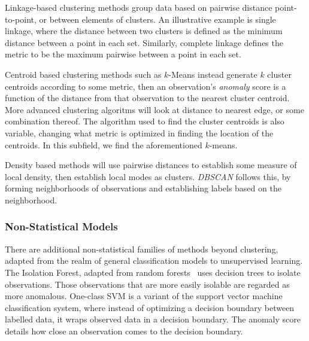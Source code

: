 Linkage-based clustering methods group data based on pairwise distance point-to-point, or between
  elements of clusters.  An illustrative example is single linkage, where the distance between two
  clusters is defined as the minimum distance between a point in each set.   Similarly, complete
  linkage defines the metric to be the maximum pairwise between a point in each set. \findcite

Centroid based clustering methods such as $k$-Means instead generate $k$ cluster centroids according
  to some metric, then an observation's \emph{anomaly} score is a function of the distance from that
  observation to the nearest cluster centroid.  More advanced clustering algoritms will look at
  distance to nearest edge, or some combination thereof.  The algorithm used to find the cluster
  centroids is also variable, changing what metric is optimized in finding the location of the
  centroids.  In this subfield, we find the aforementioned $k$-means.

Density based methods will use pairwise distances to establish some measure of local density, then
  establish local modes as clusters.  \emph{DBSCAN} \citep{ester1996} follows this, by forming
  neighborhoods of observations and establishing labels based on the neighborhood.

\subsubsection{Non-Statistical Models}
There are additional non-statistical families of methods beyond clustering, adapted from the realm
  of general classification models to unsupervised learning.  The Isolation Forest,\citep{liu2000}
  adapted from random forests~\citep{breiman2001} uses decision trees to isolate observations.  Those
  observations that are more easily isolable are regarded as more anomalous.  One-class SVM is a
  variant of the support vector machine classification system, where instead of optimizing a
  decision boundary between labelled data, it wraps observed data in a decision boundary.  The
  anomaly score details how close an observation comes to the decision boundary.
